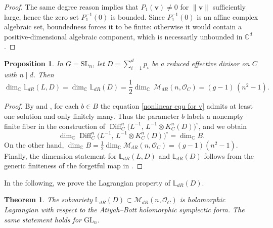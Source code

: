 \documentclass[twoside, 11pt]{article}
\numberwithin{equation}{section}
\theoremstyle{theorem}
\newtheorem{theorem}{Theorem}
\numberwithin{theorem}{section}
\newtheorem{proposition}[proposition]{Proposition}
\theoremstyle{definition}
\begin{document}
\begin{proof}
The same degree reason implies that $P_1(\boldsymbol v)\neq 0$ for $\|\boldsymbol v\|$ sufficiently large, hence the zero set $P_1^{-1}(0)$ is bounded.
Since $P_1^{-1}(0)$ is an affine complex algebraic set, boundedness forces it to be finite: otherwise it would contain a positive-dimensional algebraic component,
which is necessarily unbounded in $\mathbb{C}^d$.
\end{proof}

\begin{proposition}\label{dim count for dR}
In $G=\mathrm{SL}_n$, let \( D=\sum_{i=1}^d p_i \) be a reduced effective divisor on $C$ with $n\mid d$. Then
\[
\dim_{\mathbb{C}} \mathbb L_{dR}(L,D) = \dim_{\mathbb{C}} \mathbb L_{dR}(D)
= \frac{1}{2}\dim_{\mathbb{C}}\,\mathcal{M}_{dR}(n, \mathcal{O}_C)
= (g-1)\,(n^2-1).
\]
\end{proposition}

\begin{proof}
By  and , for each $b\in B$ the equation \eqref{nonlinear equ for v} admits at least one solution and only finitely many.
Thus the parameter $b$ labels a nonempty finite fiber in the construction of \(\operatorname{Diff}_C^{n}\!\bigl(L^{-1},\,L^{-1}\otimes K_C^{n}(D)\bigr)^{\circ}\), and we obtain
\[
\dim_{\mathbb{C}} \operatorname{Diff}_C^{n}\!\bigl(L^{-1},\,L^{-1}\otimes K_C^{n}(D)\bigr)^{\circ}
=\dim_{\mathbb{C}} B.
\]
On the other hand, $\dim_{\mathbb{C}} B=\frac12\dim_{\mathbb{C}}\mathcal{M}_{dR}(n, \mathcal{O}_C)=(g-1)(n^2-1)$.
Finally, the dimension statement for $\mathbb L_{dR}(L,D)$ and $\mathbb L_{dR}(D)$ follows from the generic finiteness of the forgetful map in . 
\end{proof}


In the following, we prove the Lagrangian property of $\mathbb{L}_{dR}(D)$.
\begin{theorem}\label{thm: lag de rham}
The subvariety $\mathbb{L}_{dR}(D)\subset \mathcal{M}_{dR}(n, \mathcal{O}_C)$ is holomorphic Lagrangian with respect to the Atiyah--Bott holomorphic symplectic form. The same statement holds for $\mathrm{GL}_n$.
\end{theorem}
\end{document}

